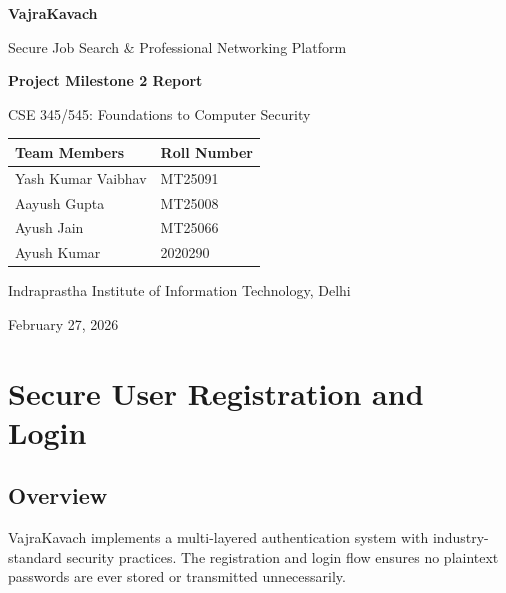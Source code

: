 \documentclass[12pt,a4paper]{article}
\begin{document}
\begin{titlepage}
\centering
\vspace*{2cm}
{\Huge\bfseries\color{primary} VajraKavach\par}
\vspace{0.5cm}
{\Large Secure Job Search \& Professional Networking Platform\par}
\vspace{2cm}
{\LARGE\bfseries Project Milestone 2 Report\par}
\vspace{0.3cm}
{\large CSE 345/545: Foundations to Computer Security\par}
\vspace{2cm}

\begin{tabular}{ll}
\toprule
\textbf{Team Members} & \textbf{Roll Number} \\
\midrule
Yash Kumar Vaibhav & MT25091 \\
Aayush Gupta & MT25008 \\
Ayush Jain & MT25066 \\
Ayush Kumar & 2020290 \\
\bottomrule
\end{tabular}

\vspace{2cm}
{\large Indraprastha Institute of Information Technology, Delhi\par}
\vspace{0.3cm}
{\large February 27, 2026\par}
\vfill
\end{titlepage}

\tableofcontents
\newpage

\section{Secure User Registration and Login}

\subsection{Overview}
VajraKavach implements a multi-layered authentication system with industry-standard security practices. The registration and login flow ensures no plaintext passwords are ever stored or transmitted unnecessarily.
\end{document}
